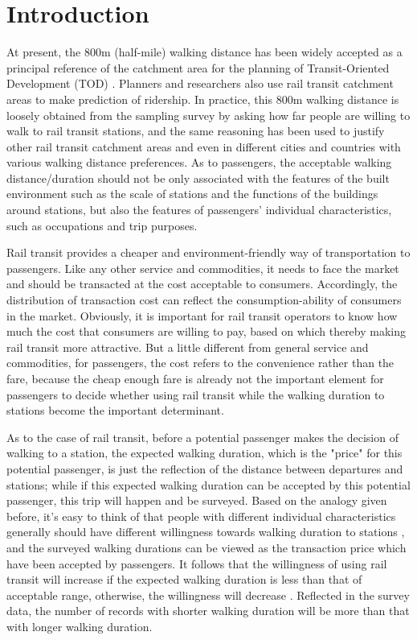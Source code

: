 \documentclass[Journal,letterpaper]{ascelike-new}
\begin{document}
\section{Introduction}
At present, the 800m (half-mile) walking distance has been widely accepted as a principal reference of the catchment area for the planning of Transit-Oriented Development (TOD) \cite{kuby2004factors,gutierrez2011transit,cardozo2012application,zhao2013influences}. Planners and researchers also use rail transit catchment areas to make prediction of ridership. In practice, this 800m walking distance is loosely obtained from the sampling survey by asking how far people are willing to walk to rail transit stations, and the same reasoning has been used to justify other rail transit catchment areas and even in different cities and countries with various walking distance preferences. As to passengers, the acceptable walking distance/duration should not be only associated with the features of the built environment such as the scale of stations and the functions of the buildings around stations, but also the features of passengers' individual characteristics, such as occupations and trip purposes.

%
Rail transit provides a cheaper and environment-friendly way of transportation to passengers. Like any other service and commodities, it needs to face the market and should be transacted at the cost acceptable to consumers. Accordingly, the distribution of transaction cost can reflect the consumption-ability of consumers in the market. Obviously, it is important for rail transit operators to know how much the cost that consumers are willing to pay, based on which thereby making rail transit more attractive. But a little different from general service and commodities, for passengers, the cost refers to the convenience rather than the fare, because the cheap enough fare is already not the important element for passengers to decide whether using rail transit while the walking duration to stations become the important determinant.

%
As to the case of rail transit, before a potential passenger makes the decision of walking to a station, the expected walking duration, which is the "price" for this potential passenger, is just the reflection of the distance between departures and stations; while if this expected walking duration can be accepted by this potential passenger, this trip will happen and be surveyed. Based on the analogy given before, it's easy to think of that people with different individual characteristics generally should have different willingness towards walking duration to stations \cite{frank1994impacts}, and the surveyed walking durations can be viewed as the transaction price which have been accepted by passengers. It follows that the willingness of using rail transit will increase if the expected walking duration is less than that of acceptable range, otherwise, the willingness will decrease \cite{waterson2003simulating}. Reflected in the survey data, the number of records with shorter walking duration will be more than that with longer walking duration. 
\end{document}
